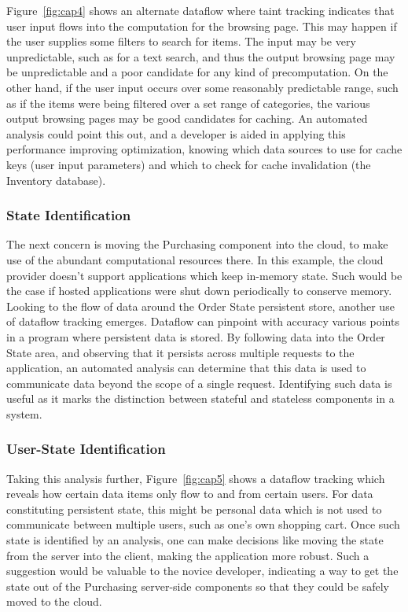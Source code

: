 \documentclass[msc,oneside]{ubcthesis}
\begin{document}
Figure~\ref{fig:cap4} shows an alternate dataflow where taint tracking indicates that user input flows into the computation for the browsing page. This may happen if the user supplies some filters to search for items. The input may be very unpredictable, such as for a text search, and thus the output browsing page may be unpredictable and a poor candidate for any kind of precomputation. On the other hand, if the user input occurs over some reasonably predictable range, such as if the items were being filtered over a set range of categories, the various output browsing pages may be good candidates for caching. An automated analysis could point this out, and a developer is aided in applying this performance improving optimization, knowing which data sources to use for cache keys (user input parameters) and which to check for cache invalidation (the Inventory database).

\subsubsection{State Identification}
The next concern is moving the Purchasing component into the cloud, to make use of the abundant computational resources there. In this example, the cloud provider doesn't support applications which keep in-memory state. Such would be the case if hosted applications were shut down periodically to conserve memory. Looking to the flow of data around the Order State persistent store, another use of dataflow tracking emerges. Dataflow can pinpoint with accuracy various points in a program where persistent data is stored. By following data into the Order State area, and observing that it persists across multiple requests to the application, an automated analysis can determine that this data is used to communicate data beyond the scope of a single request. Identifying such data is useful as it marks the distinction between stateful and stateless components in a system.

\subsubsection{User-State Identification}
Taking this analysis further, Figure~\ref{fig:cap5} shows a dataflow tracking which reveals how certain data items only flow to and from certain users. For data constituting persistent state, this might be personal data which is not used to communicate between multiple users, such as one's own shopping cart. Once such state is identified by an analysis, one can make decisions like moving the state from the server into the client, making the application more robust. Such a suggestion would be valuable to the novice developer, indicating a way to get the state out of the Purchasing server-side components so that they could be safely moved to the cloud.
\end{document}
